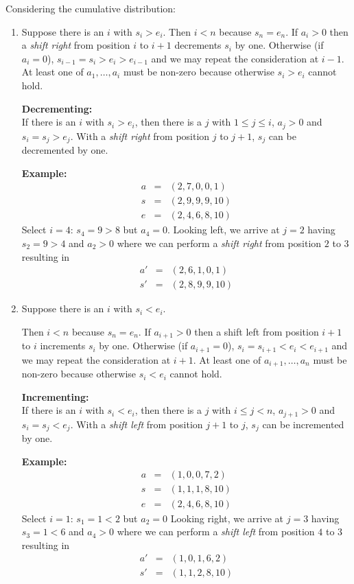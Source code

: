 \documentclass{article}
\begin{document}
Considering the cumulative distribution:
\begin{enumerate}
\item 
Suppose there is an $i$ with $s_i > e_i$.
Then $i < n$ because $s_n = e_n$.
If $a_i > 0$ then a \textit{shift right} from position $i$ to $i + 1$
decrements $s_i$ by one.
Otherwise (if $a_i = 0$), $s_{i - 1} = s_i > e_i > e_{i - 1}$ and we
may repeat the consideration at $i - 1$.
At least one of $a_1,\ldots,a_i$ must be non-zero because otherwise
$s_i > e_i$ cannot hold. 

\textbf{Decrementing:} \\
If there is an $i$ with $s_i > e_i$, then there is a $j$ with
$1 \leq j \leq i$, $a_j > 0$ and $s_i = s_j > e_j$.
With a \textit{shift right} from position $j$ to $j + 1$, $s_j$ can be
decremented by one.

\textbf{Example:}
\begin{eqnarray*}
  a & = & (2, 7, 0, 0, 1) \\
  s & = & (2, 9, 9, 9, 10) \\
  e & = & (2, 4, 6, 8, 10)
\end{eqnarray*}
Select $i = 4$: $s_4 = 9 > 8$ but $a_4 = 0$.
Looking left, we arrive at $j = 2$ having $s_2 = 9 > 4$ and $a_2 > 0$
where we can perform a \textit{shift right} from position $2$ to $3$
resulting in
\begin{eqnarray*}
  a' & = & (2, 6, 1, 0, 1) \\
  s' & = & (2, 8, 9, 9, 10)  
\end{eqnarray*}

\item
Suppose there is an $i$ with $s_i < e_i$.

Then $i < n$ because $s_n = e_n$.
If $a_{i + 1} > 0$ then a shift left from position $i + 1$ to $i$
increments $s_i$ by one. 
Otherwise (if $a_{i + 1} = 0$), $s_i = s_{i + 1} < e_i < e_{i + 1}$
and we may repeat the consideration at $i + 1$.
At least one of $a_{i + 1},\ldots,a_n$ must be non-zero because
otherwise $s_i < e_i$ cannot hold.

\textbf{Incrementing:} \\
If there is an $i$ with $s_i < e_i$, then there is a $j$ with
$i \leq j < n$, $a_{j + 1} > 0$ and $s_i = s_j < e_j$.
With a \textit{shift left} from position $j + 1$ to $j$, $s_j$ can be
incremented by one.

\textbf{Example:}
\begin{eqnarray*}
  a & = & (1, 0, 0, 7, 2) \\
  s & = & (1, 1, 1, 8, 10) \\
  e & = & (2, 4, 6, 8, 10)
\end{eqnarray*}
Select $i = 1$: $s_1 = 1 < 2$ but $a_2 = 0$
Looking right, we arrive at $j = 3$ having $s_3 = 1 < 6$ and $a_4 > 0$
where we can perform a \textit{shift left} from position $4$ to $3$
resulting in
\begin{eqnarray*}
  a' & = & (1, 0, 1, 6, 2) \\
  s' & = & (1, 1, 2, 8, 10)  
\end{eqnarray*}
\end{enumerate}
\end{document}
